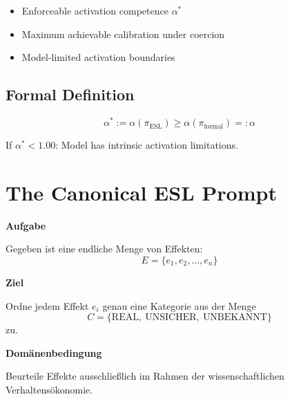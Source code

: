 \documentclass[11pt,a4paper]{article}
\begin{document}
\begin{itemize}
    \item[$\checkmark$] Enforceable activation competence $\alpha^*$
    \item[$\checkmark$] Maximum achievable calibration under coercion
    \item[$\checkmark$] Model-limited activation boundaries
\end{itemize}

\subsection{Formal Definition}

\begin{equation}
\alpha^* := \alpha(\pi_{\text{ESL}}) \geq \alpha(\pi_{\text{formal}}) =: \alpha
\end{equation}

If $\alpha^* < 1.00$: Model has intrinsic activation limitations.


\section{The Canonical ESL Prompt}

\begin{specbox}
\textbf{Aufgabe}

Gegeben ist eine endliche Menge von Effekten:
\[
E = \{e_1, e_2, \dots, e_n\}
\]

\textbf{Ziel}

Ordne jedem Effekt $e_i$ genau eine Kategorie aus der Menge
\[
C = \{\text{REAL},\ \text{UNSICHER},\ \text{UNBEKANNT}\}
\]
zu.

\textbf{Domänenbedingung}

Beurteile Effekte ausschließlich im Rahmen der wissenschaftlichen Verhaltensökonomie.
\end{specbox}
\end{document}
